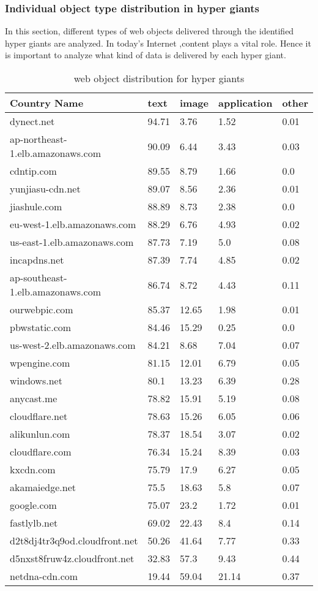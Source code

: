 \subsubsection{Individual object type distribution in hyper giants }
\noindent In this section, different types of web objects delivered through the identified hyper giants are analyzed. In today's Internet ,content plays a vital role. Hence it is important to analyze what kind of data is delivered by each hyper giant.\\

\begin{table}[htb]
\centering
\begin{tabular}[t]{|p{}|p{}||p{}||p{}||p{}|}
\hline
 Country Name     & text&image&application&other\\
 \hline
dynect.net& 94.71& 3.76& 1.52& 0.01\\
ap-northeast-1.elb.amazonaws.com& 90.09& 6.44& 3.43& 0.03\\
cdntip.com& 89.55& 8.79& 1.66& 0.0\\
yunjiasu-cdn.net& 89.07& 8.56& 2.36& 0.01\\
jiashule.com& 88.89& 8.73& 2.38& 0.0\\
eu-west-1.elb.amazonaws.com& 88.29& 6.76& 4.93& 0.02\\
us-east-1.elb.amazonaws.com& 87.73& 7.19& 5.0& 0.08\\
incapdns.net& 87.39& 7.74& 4.85& 0.02\\
ap-southeast-1.elb.amazonaws.com& 86.74& 8.72& 4.43& 0.11\\
ourwebpic.com& 85.37& 12.65& 1.98& 0.01\\
pbwstatic.com& 84.46& 15.29& 0.25& 0.0\\
us-west-2.elb.amazonaws.com& 84.21& 8.68& 7.04& 0.07\\
wpengine.com& 81.15& 12.01& 6.79& 0.05\\
windows.net& 80.1& 13.23& 6.39& 0.28\\
anycast.me& 78.82& 15.91& 5.19& 0.08\\
cloudflare.net& 78.63& 15.26& 6.05& 0.06\\
alikunlun.com& 78.37& 18.54& 3.07& 0.02\\
cloudflare.com& 76.34& 15.24& 8.39& 0.03\\
kxcdn.com& 75.79& 17.9& 6.27& 0.05\\
akamaiedge.net& 75.5& 18.63& 5.8& 0.07\\
google.com& 75.07& 23.2& 1.72& 0.01\\
fastlylb.net& 69.02& 22.43& 8.4& 0.14\\
d2t8dj4tr3q9od.cloudfront.net& 50.26& 41.64& 7.77& 0.33\\
d5nxst8fruw4z.cloudfront.net& 32.83& 57.3& 9.43& 0.44\\
netdna-cdn.com& 19.44& 59.04& 21.14& 0.37\\
 \hline
\end{tabular}
\caption{web object distribution for hyper giants}
\label{tab:hyperObject}
\end{table}

